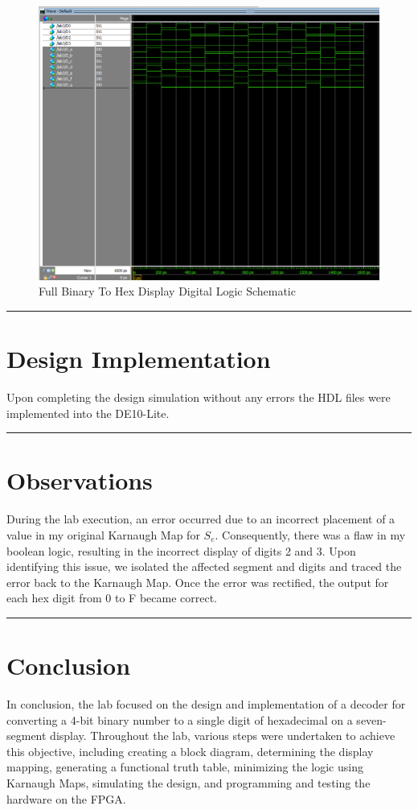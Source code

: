\documentclass{article}
\begin{document}
\begin{figure}[H]
  \centering
  \includegraphics[width=1\textwidth]{seg_sim.png}
  \caption{Full Binary To Hex Display Digital Logic Schematic}
\end{figure}
\vspace{5mm}
\hrule

\section*{\textcolor{mycolor}{Design Implementation}}
Upon completing the design simulation without any errors the HDL files were implemented into the DE10-Lite.
\vspace{5mm}
\hrule

\section*{\textcolor{mycolor}{Observations}}
During the lab execution, an error occurred due to an incorrect placement of a value in my original Karnaugh Map for $S_e$. Consequently, there was a flaw in my boolean logic, resulting in the incorrect display of digits 2 and 3. Upon identifying this issue, we isolated the affected segment and digits and traced the error back to the Karnaugh Map. Once the error was rectified, the output for each hex digit from 0 to F became correct.
\vspace{5mm}
\hrule

\section*{\textcolor{mycolor}{Conclusion}}
In conclusion, the lab focused on the design and implementation of a decoder for converting a 4-bit binary number to a single digit of hexadecimal on a seven-segment display. Throughout the lab, various steps were undertaken to achieve this objective, including creating a block diagram, determining the display mapping, generating a functional truth table, minimizing the logic using Karnaugh Maps, simulating the design, and programming and testing the hardware on the FPGA.
\end{document}
